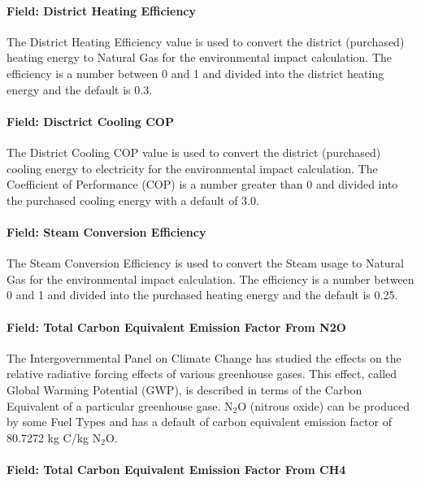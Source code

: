 \paragraph{Field: District Heating Efficiency}\label{field-district-heating-efficiency}

The District Heating Efficiency value is used to convert the district (purchased) heating energy to Natural Gas for the environmental impact calculation. The efficiency is a number between 0 and 1 and divided into the district heating energy and the default is 0.3.

\paragraph{Field: Disctrict Cooling COP}\label{field-disctrict-cooling-cop}

The District Cooling COP value is used to convert the district (purchased) cooling energy to electricity for the environmental impact calculation. The Coefficient of Performance (COP) is a number greater than 0 and divided into the purchased cooling energy with a default of 3.0.

\paragraph{Field: Steam Conversion Efficiency}\label{field-steam-conversion-efficiency}

The Steam Conversion Efficiency is used to convert the Steam usage to Natural Gas for the environmental impact calculation. The efficiency is a number between 0 and 1 and divided into the purchased heating energy and the default is 0.25.

\paragraph{Field: Total Carbon Equivalent Emission Factor From N2O}\label{field-total-carbon-equivalent-emission-factor-from-n2o}

The Intergovernmental Panel on Climate Change has studied the effects on the relative radiative forcing effects of various greenhouse gases. This effect, called Global Warming Potential (GWP), is described in terms of the Carbon Equivalent of a particular greenhouse gase. N\(_{2}\)O (nitrous oxide) can be produced by some Fuel Types and has a default of carbon equivalent emission factor of 80.7272 kg C/kg N\(_{2}\)O.

\paragraph{Field: Total Carbon Equivalent Emission Factor From CH4}\label{field-total-carbon-equivalent-emission-factor-from-ch4}

